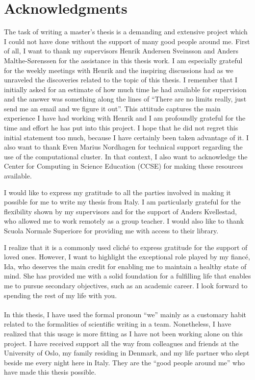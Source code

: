 \chapter*{Acknowledgments}
The task of writing a master's thesis is a demanding and extensive project which
I could not have done without the support of many good people around me. First
of all, I want to thank my supervisors Henrik Andersen Sveinsson and Anders
Malthe-Sørenssen for the assistance in this thesis work. I am especially
grateful for the weekly meetings with Henrik and the inspiring discussions
had as we unraveled the discoveries related to the topic of this thesis. I
remember that I initially asked for an estimate of how much time he had
available for supervision and the answer was something along the lines of
``There are no limits really, just send me an email and we figure it out''. This
attitude captures the main experience I have had working with Henrik and I am
profoundly grateful for the time and effort he has put into this project. I
hope that he did not regret this initial statement too much, because I have
certainly been taken advantage of it. I also want to thank Even Marius Nordhagen
for technical support regarding the use of the computational cluster. In that
context, I also want to acknowledge the Center for Computing in Science
Education (CCSE) for making these resources available. 

I would like to express my gratitude to all the parties involved in making it
possible for me to write my thesis from Italy. I am particularly grateful for
the flexibility shown by my supervisors and for the support of Anders
Kvellestad, who allowed me to work remotely as a group teacher. I would also
like to thank Scuola Normale Superiore for providing me with access to their
library.

I realize that it is a commonly used cliché to express gratitude for the support
of loved ones. However, I want to highlight the exceptional role played by my
fiancé, Ida, who deserves the main credit for enabling me to maintain a healthy
state of mind. She has provided me with a solid foundation for a fulfilling life
that enables me to pursue secondary objectives, such as an academic career. I
look forward to spending the rest of my life with you. \\
\\
In this thesis, I have used the formal pronoun ``we'' mainly as a customary
habit related to the formalities of scientific writing in a team. Nonetheless, I
have realized that this usage is more fitting as I have not been working alone
on this project. I have received support all the way from colleagues and friends
at the University of Oslo, my family residing in Denmark, and my life partner who slept beside me every night here in Italy. They are the ``good people
around me'' who have made this thesis possible.





